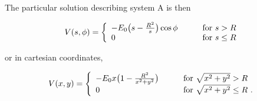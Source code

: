 \documentclass[a4paper]{jpconf}
\begin{document}
%
%
%
%

\noindent The particular solution describing system A is then

\begin{equation}
V(s,\phi) = \left\{ 
  \begin{array}{l l}
   -E_0 \big(s - \frac{R^2}{s}\big) \cos{\phi}  & \qquad \text{for $s > R$}\\
    0 & \qquad \text{for $s \le R$}
  \end{array} \right.
\end{equation}

\noindent or in cartesian coordinates, 

\begin{equation}
V(x,y) = \left\{ 
  \begin{array}{l l}
   -E_0 x \big(1 - \frac{R^2}{x^2 + y^2}\big) & \qquad \text{for $\sqrt{x^2 + y^2} > R$}\\
    0 & \qquad \text{for $\sqrt{x^2 + y^2} \le R$~.}
  \end{array} \right.
  \label{eq:cartesian}
\end{equation}

%
\end{document}
